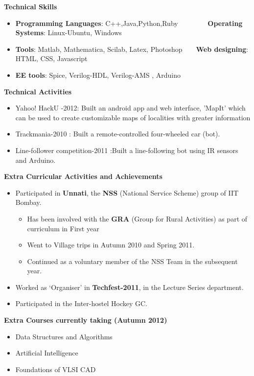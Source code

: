 \documentclass[a4paper,10pt]{article}
\newcommand{\resheading}[1]{{\small \colorbox{mygrey}{\begin{minipage}{0.975\textwidth}{\textbf{#1 \vphantom{p\^{E}}}}\end{minipage}}}}
\begin{document}
\resheading{\textbf{\large Technical Skills}}
\begin{itemize}
  \item \textbf{Programming Languages}: C++,Java,Python,Ruby \  \ \ \ \ \ \ \  \textbf{Operating Systems}: Linux-Ubuntu, Windows\\[-0.6cm]
  \item \textbf{Tools}: Matlab, Mathematica, Scilab, Latex, Photoshop\ \ \ \  \textbf{Web designing}: HTML, CSS, Javascript\\[-0.6cm]
  \item \textbf{EE tools}: Spice, Verilog-HDL, Verilog-AMS , Arduino
\end{itemize}

\resheading{\textbf{\large Technical Activities}}
\begin{itemize}
 \item Yahoo! HackU -2012: Built an android app and web interface, 'MapIt' which can be used to create customizable maps of localities with greater information\\[-0.7cm]
 \item Trackmania-2010 : Built a remote-controlled four-wheeled car (bot). \\[-0.7cm]
 	
 \item Line-follower competition-2011 :Built a line-following bot using IR sensors and Arduino.
\end{itemize}

\resheading{\textbf{\large Extra Curricular Activities and Achievements}}
\begin{itemize}
  \item Participated in \textbf{Unnati}, the \textbf{NSS} (National Service Scheme) group of IIT Bombay.\\[-0.7cm]
	\begin{itemize}
	 \item Has been involved with the \textbf{GRA} (Group for Rural Activities) as part of curriculum in First year\\[-0.6cm]
	 \item Went to Village trips in Autumn 2010 and Spring 2011.\\[-0.6cm]
	 \item Continued as a voluntary member of the NSS Team in the subsequent year.\\[-0.6cm]
	  \end{itemize}
  \item Worked as `Organiser' in \textbf{Techfest-2011}, in the Lecture Series department. \\[-0.6cm]
  \item Participated in the Inter-hostel Hockey GC. 
\end{itemize}

\resheading{\textbf{\large Extra Courses currently taking (Autumn 2012)}}
  \begin{itemize}
  \item Data Structures and Algorithms
  \item Artificial Intelligence
  \item Foundations of VLSI CAD
\end{itemize}
\end{document}
